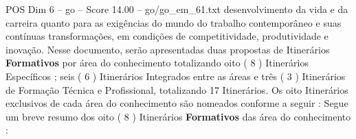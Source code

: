 \begin{textsample}{POS Dim 6 – go – Score 14.00 – go/go\_em\_61.txt}
desenvolvimento da vida e da carreira quanto para as exigências do mundo do trabalho contemporâneo e suas contínuas transformações, em condições de competitividade, produtividade e inovação.
Nesse documento, serão apresentadas duas propostas de Itinerários \textbf{Formativos} por área do conhecimento totalizando oito ( 8 ) Itinerários Específicos ; seis ( 6 ) Itinerários Integrados entre as áreas e três ( 3 ) Itinerários de Formação Técnica e Profissional, totalizando 17 Itinerários.
Os oito Itinerários exclusivos de cada área do conhecimento são nomeados conforme a seguir : Segue um breve resumo dos oito ( 8 ) Itinerários \textbf{Formativos} das área do conhecimento :

\end{textsample}
